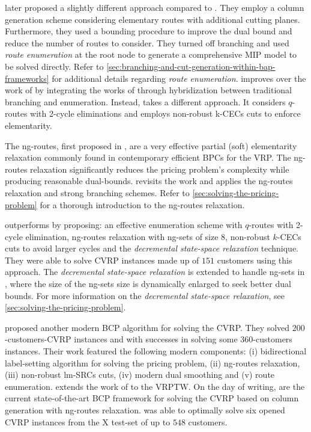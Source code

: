 \Textcite{baldacci2008} later proposed a slightly different approach compared to \textcite{fukasawa2006}.
They employ a column generation scheme considering elementary routes
with additional cutting planes.
Furthermore, they used a bounding procedure to improve the dual bound
and reduce the number of routes to consider.
They turned off branching and used \textit{route enumeration}
at the root node to generate a comprehensive MIP model to be solved directly.
Refer to \cref{sec:branching-and-cut-generation-within-bap-frameworks} for additional details
regarding \textit{route enumeration}.
\textcite{pessoa2008} improves over the work of \textcite{fukasawa2006}
by integrating the works of \textcite{fukasawa2006, baldacci2008}
through hybridization between traditional branching and enumeration.
Instead, \textcite{contardo2011} takes a different approach.
It considers $q$-routes with 2-cycle eliminations and employs non-robust k-CECs cuts
to enforce elementarity.

The ng-routes, first proposed in \textcite{baldacci2011},
are a very effective partial (soft) elementarity relaxation
commonly found in contemporary efficient BPCs for the VRP.
The ng-routes relaxation significantly reduces the pricing problem's complexity
while producing reasonable dual-bounds.
\textcite{ropke2012} revisits the work \textcite{fukasawa2006}
and applies the ng-routes relaxation and strong branching schemes.
Refer to \cref{sec:solving-the-pricing-problem} for a thorough introduction to the ng-routes relaxation.

\Textcite{contardo2014} outperforms \textcite{contardo2011}
by proposing: an effective enumeration scheme with
$q$-routes with 2-cycle elimination, ng-routes relaxation with ng-sets of size $8$,
non-robust $k$-CECs cuts to avoid larger cycles
and the \textit{decremental state-space relaxation} technique.
They were able to solve CVRP instances made up of $151$ customers using this approach.
The \textit{decremental state-space relaxation} is extended to handle ng-sets in \textcite{martinelli2014},
where the size of the ng-sets size is dynamically enlarged to seek better dual bounds.
For more information on the \textit{decremental state-space relaxation},
see \cref{sec:solving-the-pricing-problem}.

\Textcite{pecin2017improved} proposed another modern BCP algorithm for solving the CVRP.
They solved $200$-customers-CVRP instances and with successes in solving some $360$-customers instances.
Their work featured the following modern components:
(i) bidirectional label-setting algorithm for solving the pricing problem,
(ii) ng-routes relaxation,
(iii) non-robust lm-SRCs cuts,
(iv) modern dual smoothing
and (v) route enumeration.
\Textcite{pecin2017new} extends the work of \textcite{pecin2017improved} to the VRPTW.
On the day of writing, \textcite{pessoa2018enhanced, pessoa2020generic}
are the current state-of-the-art BCP framework for solving the CVRP
based on column generation with ng-routes relaxation.
\Textcite{pessoa2020generic} was able to optimally solve six opened CVRP instances
from the X test-set \parencite{uchoa2017} of up to $548$ customers.

